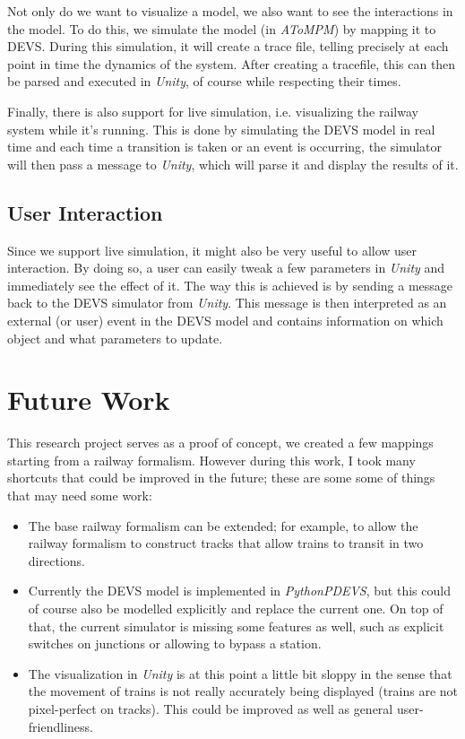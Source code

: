 \documentclass{article}
\begin{document}
Not only do we want to visualize a model, we also want to see the interactions in the model. To do this, we simulate the model (in \textit{AToMPM}) by mapping it to DEVS. During this simulation, it will create a trace file, telling precisely at each point in time the dynamics of the system. After creating a tracefile, this can then be parsed and executed in \textit{Unity}, of course while respecting their times.

Finally, there is also support for live simulation, i.e. visualizing the railway system while it's running. This is done by simulating the DEVS model in real time and each time a transition is taken or an event is occurring, the simulator will then pass a message to \textit{Unity}, which will parse it and display the results of it.

\subsection{User Interaction}

Since we support live simulation, it might also be very useful to allow user interaction. By doing so, a user can easily tweak a few parameters in \textit{Unity} and immediately see the effect of it. The way this is achieved is by sending a message back to the DEVS simulator from \textit{Unity}. This message is then interpreted as an external (or user) event in the DEVS model and contains information on which object and what parameters to update.

\section{Future Work}

This research project serves as a proof of concept, we created a few mappings starting from a railway formalism. However during this work, I took many shortcuts that could be improved in the future; these are some some of things that may need some work:

\begin{itemize}
    \item The base railway formalism can be extended; for example, to allow the railway formalism to construct tracks that allow trains to transit in two directions.
    \item Currently the DEVS model is implemented in \textit{PythonPDEVS}, but this could of course also be modelled explicitly and replace the current one. On top of that, the current simulator is missing some features as well, such as explicit switches on junctions or allowing to bypass a station.
    \item The visualization in \textit{Unity} is at this point a little bit sloppy in the sense that the movement of trains is not really accurately being displayed (trains are not pixel-perfect on tracks). This could be improved as well as general user-friendliness.
\end{itemize}
\end{document}
